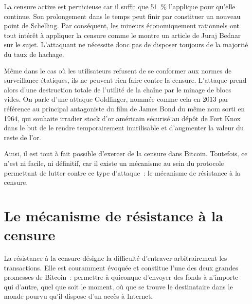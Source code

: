 La censure active est pernicieuse car il suffit que 51~\% l'applique pour qu'elle continue. Son prolongement dans le temps peut finir par constituer un nouveau point de Schelling. Par conséquent, les mineurs économiquement rationnels ont tout intérêt à appliquer la censure comme le montre un article de Juraj Bednar sur le sujet. L'attaquant ne nécessite donc pas de disposer toujours de la majorité du taux de hachage.

Même dans le cas où les utilisateurs refusent de se conformer aux normes de surveillance étatiques, ils ne peuvent rien faire contre la censure. L'attaque prend alors d'une destruction totale de l'utilité de la chaîne par le minage de blocs vides. On parle d'une attaque Goldfinger, nommée comme cela en 2013 par référence au principal antagoniste du film de James Bond du même nom sorti en 1964, qui souhaite irradier stock d'or américain sécurisé au dépôt de Fort Knox dans le but de le rendre temporairement inutilisable et d'augmenter la valeur du reste de l'or.

Ainsi, il est tout à fait possible d'exercer de la censure dans Bitcoin. Toutefois, ce n'est ni facile, ni définitif, car il existe un mécanisme au sein du protocole  permettant de lutter contre ce type d'attaque~: le mécanisme de résistance à la censure.

\section*{Le mécanisme de résistance à la censure}

La résistance à la censure désigne la difficulté d'entraver arbitrairement les transactions. Elle est couramment évoquée et constitue l'une des deux grandes promesses de Bitcoin~: permettre à quiconque d'envoyer des fonds à n'importe qui d'autre, quel que soit le moment, où que se trouve le destinataire dans le monde pourvu qu'il dispose d'un accès à Internet.

